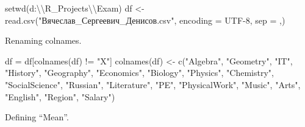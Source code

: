 \documentclass[
]{article}
\author{}
\date{\vspace{-2.5em}}
\newenvironment{Shaded}{\begin{snugshade}}{\end{snugshade}}
\newcommand{\AttributeTok}[1]{\textcolor[rgb]{0.77,0.63,0.00}{#1}}
\newcommand{\ControlFlowTok}[1]{\textcolor[rgb]{0.13,0.29,0.53}{\textbf{#1}}}
\newcommand{\DecValTok}[1]{\textcolor[rgb]{0.00,0.00,0.81}{#1}}
\newcommand{\FunctionTok}[1]{\textcolor[rgb]{0.00,0.00,0.00}{#1}}
\newcommand{\NormalTok}[1]{#1}
\newcommand{\OtherTok}[1]{\textcolor[rgb]{0.56,0.35,0.01}{#1}}
\newcommand{\SpecialCharTok}[1]{\textcolor[rgb]{0.00,0.00,0.00}{#1}}
\newcommand{\StringTok}[1]{\textcolor[rgb]{0.31,0.60,0.02}{#1}}
\begin{document}
\begin{Shaded}
\begin{Highlighting}[]
\FunctionTok{setwd}\NormalTok{(}\StringTok{\textquotesingle{}d:}\SpecialCharTok{\textbackslash{}\textbackslash{}}\StringTok{R\_Projects}\SpecialCharTok{\textbackslash{}\textbackslash{}}\StringTok{Exam\textquotesingle{}}\NormalTok{) }
\NormalTok{df }\OtherTok{\textless{}{-}} \FunctionTok{read.csv}\NormalTok{(}\StringTok{"Вячеслав\_Сергеевич\_Денисов.csv"}\NormalTok{, }\AttributeTok{encoding =} \StringTok{\textquotesingle{}UTF{-}8\textquotesingle{}}\NormalTok{, }\AttributeTok{sep =} \StringTok{\textquotesingle{},\textquotesingle{}}\NormalTok{) }
\end{Highlighting}
\end{Shaded}

Renaming colnames.

\begin{Shaded}
\begin{Highlighting}[]
\NormalTok{df }\OtherTok{=}\NormalTok{ df[}\FunctionTok{colnames}\NormalTok{(df) }\SpecialCharTok{!=} \StringTok{"X"}\NormalTok{] }
\FunctionTok{colnames}\NormalTok{(df) }\OtherTok{\textless{}{-}} \FunctionTok{c}\NormalTok{(}\StringTok{"Algebra"}\NormalTok{, }\StringTok{"Geometry"}\NormalTok{, }\StringTok{"IT"}\NormalTok{, }\StringTok{"History"}\NormalTok{, }\StringTok{"Geography"}\NormalTok{, }\StringTok{"Economics"}\NormalTok{, }\StringTok{"Biology"}\NormalTok{, }\StringTok{"Physics"}\NormalTok{, }\StringTok{"Chemistry"}\NormalTok{, }\StringTok{"SocialScience"}\NormalTok{, }\StringTok{"Russian"}\NormalTok{, }\StringTok{"Literature"}\NormalTok{, }\StringTok{"PE"}\NormalTok{, }\StringTok{"PhysicalWork"}\NormalTok{, }\StringTok{"Music"}\NormalTok{, }\StringTok{"Arts"}\NormalTok{, }\StringTok{"English"}\NormalTok{, }\StringTok{"Region"}\NormalTok{, }\StringTok{"Salary"}\NormalTok{) }
\end{Highlighting}
\end{Shaded}

Defining ``Mean''.

\begin{Shaded}
\end{Shaded}
\end{document}
